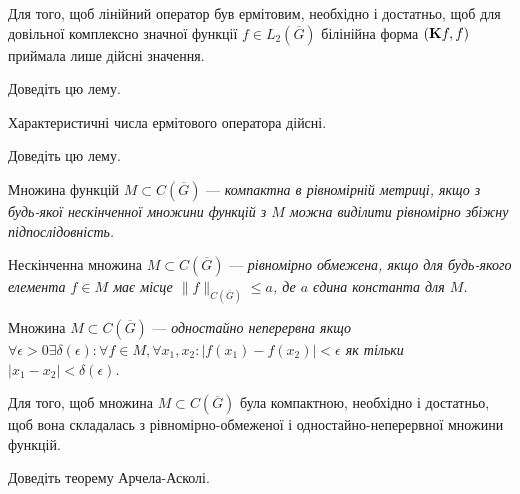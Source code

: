 \begin{lemma}
	Для того, щоб лінійний оператор був ермітовим, необхідно і достатньо, щоб для довільної комплексно значної функції $f \in L_2\left(\overline G\right)$ білінійна форма $(\bf{K}f, f)$ приймала лише дійсні значення.
\end{lemma}

\begin{exercise}
	Доведіть цю лему.
\end{exercise}

\begin{lemma}
	Характеристичні числа ермітового оператора дійсні.
\end{lemma}

\begin{exercise}
	Доведіть цю лему.
\end{exercise}

\begin{definition}
	Множина функцій $M \subset C\left(\overline G\right)$ --- \it{компактна в рівномірній метриці}, якщо з будь-якої нескінченної множини функцій з $M$ можна виділити рівномірно збіжну підпослідовність.
\end{definition}

\begin{definition}
	Нескінченна множина $M \subset C\left(\overline G\right)$ --- \it{рівномірно обмежена}, якщо для будь-якого елемента $f \in M$ має місце $\|f\|_{C(\overline G)} \le a$, де $a$ єдина константа для $M$.
\end{definition}

\begin{definition}
	Множина $M \subset C\left(\overline G\right)$ --- \it{одностайно неперервна} якщо $\forall \epsilon > 0 \exists \delta(\epsilon): \forall f \in M, \forall x_1, x_2: |f(x_1) - f(x_2)| < \epsilon$ як тільки $|x_1 - x_2| < \delta(\epsilon)$.
\end{definition}

\begin{theorem}
	Для того, щоб множина $M \subset C\left(\overline G\right)$ була компактною, необхідно і достатньо, щоб вона складалась з рівномірно-обмеженої і одностайно-неперервної множини функцій.
\end{theorem}

\begin{sproblem}
	Доведіть теорему Арчела-Асколі.
\end{sproblem}

